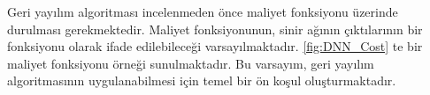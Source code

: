 Geri yayılım algoritması incelenmeden önce maliyet fonksiyonu üzerinde durulması gerekmektedir. Maliyet fonksiyonunun, sinir ağının çıktılarının bir fonksiyonu olarak ifade edilebileceği varsayılmaktadır. \ref{fig:DNN_Cost} te bir maliyet fonksiyonu örneği sunulmaktadır. Bu varsayım, geri yayılım algoritmasının uygulanabilmesi için temel bir ön koşul oluşturmaktadır.

\begin{figure}[H]
    \centering
\end{figure}
